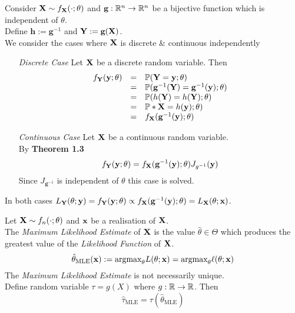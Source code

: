 \documentclass[11pt,a4paper]{article}
\begin{document}
Consider $\textbf{X}\sim f_{\textbf{X}}(\cdot;\theta)$ and $\textbf{g}:\mathbb{R}^n\to\mathbb{R}^n$ be a bijective function which is independent of $\theta$.\\
Define $\textbf{h}:=\textbf{g}^{-1}$ and $\textbf{Y}:=\textbf{g}(\textbf{X})$.\\
We consider the cases where $\textbf{X}$ is discrete \& continuous independently
\begin{itemize}
	\item[\textit{Discrete Case}] Let $\textbf{X}$ be a discrete random variable. Then
	\[\begin{array}{rcl}
	f_\textbf{Y}(\textbf{y};\theta)&=&\mathbb{P}(\textbf{Y}=\textbf{y};\theta)\\
	&=&\mathbb{P}(\textbf{g}^{-1}(\textbf{Y})=\textbf{g}^{-1}(\textbf{y});\theta)\\
	&=&\mathbb{P}(h(\textbf{Y})=h(\textbf{Y});\theta)\\
	&=&\mathbb{P}*\textbf{X}=h(\textbf{y});\theta)\\
	&=&f_{\textbf{X}}(\textbf{g}^{-1}(\textbf{y});\theta)
	\end{array}\]
	\item[\textit{Continuous Case}] Let $\textbf{X}$ be a continuous random variable.\\
	By \textbf{Theorem 1.3}
	$$f_\textbf{Y}(\textbf{y};\theta)=f_{\textbf{X}}(\textbf{g}^{-1}(\textbf{y});\theta)J_{g^{-1}}(\textbf{y})$$
	Since $J_{\textbf{g}^{-1}}$ is independent of $\theta$ this case is solved.
\end{itemize}
In both cases $L_\textbf{Y}(\theta;\textbf{y})=f_\textbf{Y}(\textbf{y};\theta)\propto f_{\textbf{X}}(\textbf{g}^{-1}(\textbf{y});\theta)=L_{\textbf{X}}(\theta;\textbf{x})$.\proved

Let $\textbf{X}\sim f_n(\cdot;\theta)$ and $\textbf{x}$ be a realisation of $\textbf{X}$.\\
The \textit{Maximum Likelihood Estimate} of $\textbf{X}$ is the value $\hat\theta\in\Theta$ which produces the greatest value of the \textit{Likelihood Function} of $\textbf{X}$.
$$\hat\theta_\text{MLE}(\textbf{x}):=\text{argmax}_\theta L(\theta;\textbf{x})=\text{argmax}_\theta\ell(\theta;\textbf{x})$$
\nb The \textit{Maximum Likelihood Estimate} is not necessarily unique.\\

Define random variable $\tau=g(X)$ where $g:\mathbb{R}\to\mathbb{R}$. Then
$$\hat\tau_\text{MLE}=\tau(\hat\theta_\text{MLE})$$
\end{document}
